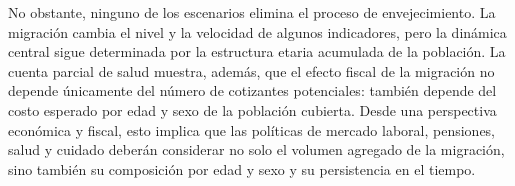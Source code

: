 \documentclass[12pt,a4paper]{article}
\begin{document}
No obstante, ninguno de los escenarios elimina el proceso de envejecimiento. La migración cambia el nivel y la velocidad de algunos indicadores, pero la dinámica central sigue determinada por la estructura etaria acumulada de la población. La cuenta parcial de salud muestra, además, que el efecto fiscal de la migración no depende únicamente del número de cotizantes potenciales: también depende del costo esperado por edad y sexo de la población cubierta. Desde una perspectiva económica y fiscal, esto implica que las políticas de mercado laboral, pensiones, salud y cuidado deberán considerar no solo el volumen agregado de la migración, sino también su composición por edad y sexo y su persistencia en el tiempo.
\end{document}
